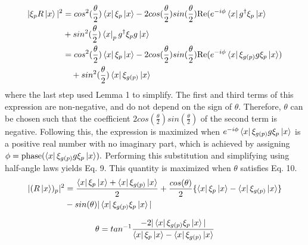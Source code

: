 \begin{align}
\label{eq8}
    |\xi_pR\mathinner{|{x}\rangle}|^2 &= cos^2(\frac{\theta}{2})\mathinner{\langle{x}|}\xi_p\mathinner{|{x}\rangle} 
  - 2cos(\frac{\theta}{2})sin(\frac{\theta}{2})\text{Re}(e^{-i\phi}
  \mathinner{\langle{x}|}g^\dagger\xi_p\mathinner{|{x}\rangle} \nonumber \\
  & + sin^2(\frac{\theta}{2})\mathinner{\langle{x}|}_p g^\dagger \xi_p g\mathinner{|{x}\rangle} \\
  &= cos^2(\frac{\theta}{2})\mathinner{\langle{x}|}\xi_p\mathinner{|{x}\rangle} 
  - 2cos(\frac{\theta}{2})sin(\frac{\theta}{2})\text{Re}
  (e^{-i\phi}\mathinner{\langle{x}|}\xi_{g(p)}g\xi_p\mathinner{|{x}\rangle}) \nonumber \\
  &\quad + sin^2(\frac{\theta}{2})\mathinner{\langle{x}|}\xi_{g(p)}\mathinner{|{x}\rangle} \nonumber
\end{align}
where the last step used Lemma 1 to simplify. The first and third terms of
this expression are non-negative, and do not depend on the sign of $\theta$.
Therefore, $\theta$ can be chosen such that the coefficient
$2cos(\frac{\theta}{2})sin(\frac{\theta}{2})$ of the second term is negative.
Following this, the expression is maximized when $e^{-i\phi}\mathinner{\langle{x}|}\xi_{g(p)}g\xi_p\mathinner{|{x}\rangle}$
is a positive real number with no imaginary part, which is achieved by assigning $\phi = \text{phase}(\mathinner{\langle{x}|} \xi_{g(p)} g \xi_p\mathinner{|{x}\rangle}).$
Performing this substitution and simplifying using half-angle laws yields Eq. 9. This quantity is maximized when $\theta$ satisfies Eq. 10.
\begin{align}
\label{eq9}
|(R\mathinner{|{x}\rangle})_p|^2 &= \frac{\mathinner{\langle{x}|}\xi_p\mathinner{|{x}\rangle} + \mathinner{\langle{x}|}\xi_{g(p)}\mathinner{|{x}\rangle}}{2}  + \frac{cos(\theta)}{2} \{\mathinner{\langle{x}|}\xi_p\mathinner{|{x}\rangle} - \mathinner{\langle{x}|}\xi_{g(p)}\mathinner{|{x}\rangle}\} \\ \nonumber
& - sin(\theta)| \mathinner{\langle{x}|}\xi_{g(p)}\xi_p\mathinner{|{x}\rangle} |
\end{align}

\begin{align}
\label{eq10}
\theta = tan^{-1} \frac{-2| \mathinner{\langle{x}|}\xi_{g(p)}\xi_p\mathinner{|{x}\rangle} |}{\mathinner{\langle{x}|}\xi_p\mathinner{|{x}\rangle} - \mathinner{\langle{x}|}\xi_{g(p)}\mathinner{|{x}\rangle}} 
\end{align}


